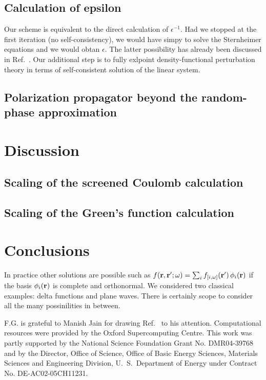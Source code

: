 \documentclass[twocolumn,prb,showpacs,superscriptaddress]{revtex4}
\def\w{\omega}
\def\r{{\bf r}}
\def\rp{{\bf r^\prime}}
\begin{document}
\subsection{Calculation of epsilon}

Our scheme is equivalent to the direct calculation of $\epsilon^{-1}$.
Had we stopped at the first iteration (no self-consistency), we would have
simpy to solve the Sternheimer equations and we would obtan $\epsilon$.
The latter possibility has already been discussed in Ref.\ .
Our additional step is to fully exlpoint density-functional perturbation theory
in terms of self-consistent solution of the linear system.

\subsection{Polarization propagator beyond the random-phase approximation}\label{sec.beyond_rpa}

\section{Discussion}\label{sec.discussion}

\subsection{Scaling of the screened Coulomb calculation}\label{sec.coulomb.scaling}
\subsection{Scaling of the Green's function calculation}\label{sec.green.scaling}

\section{Conclusions}\label{sec.conclusion}

In practice other solutions are possible such as $f(\r,\rp;\w) = \sum_i f_{[i,\w]}(\rp) \, \phi_i(\r)$
if the basis $\phi_i(\r)$ is complete and orthonormal. We considered two classical
examples: delta functions and plane waves. There is certainly scope to consider
all the many possinilities in between.

\begin{acknowledgments}
F.G. is grateful to Manish Jain for drawing Ref.\  to his attention.
Computational resources were provided by the Oxford Supercomputing Centre.
This work was partly supported by the National Science Foundation Grant No. DMR04-39768 and by
the Director, Office of Science, Office of Basic Energy Sciences, Materials Sciences
and Engineering Division, U.\ S.\ Department of Energy under Contract No. DE-AC02-05CH11231.
\end{acknowledgments}
\end{document}
